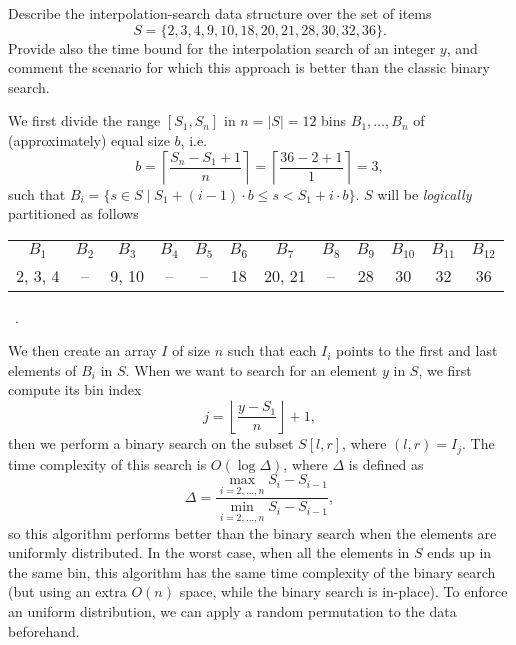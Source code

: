 \exercise

Describe the interpolation-search data structure over the set of items $$S = \{
2, 3, 4, 9, 10, 18, 20, 21, 28, 30, 32, 36 \}.$$ Provide also the time bound for
the interpolation search of an integer $y$, and comment the scenario for which
this approach is better than the classic binary search.

\solution

We first divide the range $[S_1, S_n]$ in $n = |S| = 12$ bins $B_1, \dots, B_n$
of (approximately) equal size $b$, i.e. $$b = \left\lceil\frac{S_n - S_1 +
1}{n}\right\rceil = \left\lceil\frac{36 - 2 + 1}{1}\right\rceil = 3,$$ such that
$B_i = \{ s \in S \mid S_1 + (i - 1) \cdot b \le s < S_1 + i \cdot b \}$.  $S$
will be \emph{logically} partitioned as follows
%
\begin{center}
  \begin{tabular}{c|c|c|c|c|c|c|c|c|c|c|c}
    $B_1$ & $B_2$ & $B_3$ & $B_4$ & $B_5$ & $B_6$ & $B_7$ & $B_8$ & $B_9$ & $B_{10}$ & $B_{11}$ & $B_{12}$ \\
    2, 3, 4 & -- & 9, 10 & -- & -- & 18 & 20, 21 & -- & 28 & 30 & 32 & 36 \\
  \end{tabular}\ .
\end{center}
%
We then create an array $I$ of size $n$ such that each $I_i$ points to the first
and last elements of $B_i$ in $S$. When we want to search for an element $y$ in
$S$, we first compute its bin index $$j = \left\lfloor\frac{y -
S_1}{n}\right\rfloor + 1 ,$$ then we perform a binary search on the subset $S[l,
r]$, where $(l, r) = I_j$. The time complexity of this search is $O(\log
\Delta)$, where $\Delta$ is defined as $$\Delta = \frac{\max_{i = 2, \dots, n}
S_i - S_{i-1}}{\min_{i = 2, \dots, n} S_i - S_{i-1}},$$ so this algorithm
performs better than the binary search when the elements are uniformly
distributed. In the worst case, when all the elements in $S$ ends up in the same
bin, this algorithm has the same time complexity of the binary search (but using
an extra $O(n)$ space, while the binary search is in-place). To enforce an
uniform distribution, we can apply a random permutation to the data beforehand.
